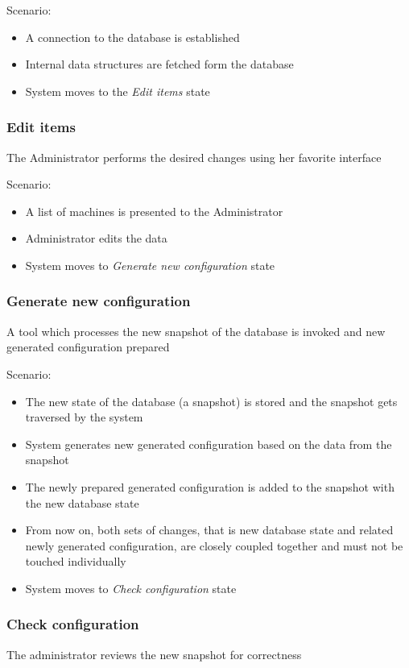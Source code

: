 \documentclass{article}
\begin{document}
Scenario:
\begin{itemize}
    \item{A connection to the database is established}
    \item{Internal data structures are fetched form the database}
    \item{System moves to the {\em Edit items} state}
\end{itemize}

\subsubsection{Edit items}
The Administrator performs the desired changes using her favorite interface

Scenario:
\begin{itemize}
    \item{A list of machines is presented to the Administrator}
    \item{Administrator edits the data}
    \item{System moves to {\em Generate new configuration} state}
\end{itemize}

\subsubsection{Generate new configuration}
A tool which processes the new snapshot of the database is invoked and new
generated configuration prepared

Scenario:
\begin{itemize}
    \item{The new state of the database (a snapshot) is stored and the snapshot
        gets traversed by the system}
    \item{System generates new generated configuration based on the data from
        the snapshot}
    \item{The newly prepared generated configuration is added to the snapshot
        with the new database state}
    \item{From now on, both sets of changes, that is new database state and
        related newly generated configuration, are closely coupled together and
        must not be touched individually}
    \item{System moves to {\em Check configuration} state}
\end{itemize}

\subsubsection{Check configuration}
The administrator reviews the new snapshot for correctness
\end{document}
